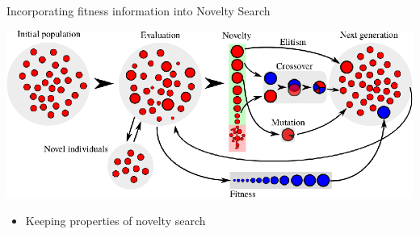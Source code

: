 \documentclass[6pt]{beamer}
\begin{document}
\begin{frame}{Incorporating fitness information into Novelty Search}
\begin{center}
\includegraphics[width=\textwidth]{../Figures/Misc/EvolutionNoveltyFitnessElitism.eps}
\end{center}
\begin{itemize}
\item Keeping properties of novelty search
\end{itemize}
\end{frame}
\end{document}
